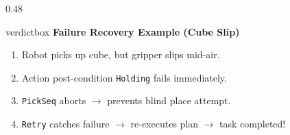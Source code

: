 \documentclass[10pt]{beamer}
\begin{document}
\begin{frame}[fragile]
\begin{columns}[T]
\begin{column}{0.48\textwidth}
        \vspace{0.10cm}
        \begin{beamercolorbox}[sep=3.5pt,shadow=true,rounded=true]{verdictbox}
            \scriptsize \textbf{Failure Recovery Example (Cube Slip)} \\
            \tiny
            \begin{enumerate}
                \tiny
                \item Robot picks up cube, but gripper slips mid-air.
                \item Action post-condition \texttt{Holding} fails immediately.
                \item \texttt{PickSeq} aborts $\to$ prevents blind place attempt.
                \item \texttt{Retry} catches failure $\to$ re-executes plan $\to$ task completed!
            \end{enumerate}
        \end{beamercolorbox}
    \end{column}
\end{columns}
\end{frame}
\end{document}

